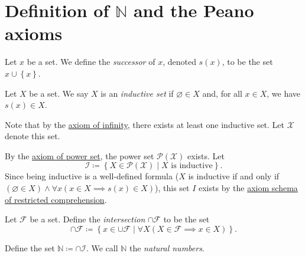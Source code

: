 \documentclass{article}
\begin{document}
\section{Definition of $\mathbb{N}$ and the Peano axioms}

\begin{definition}\label{dfn:6}
	Let $x$ be a set. We define the \emph{successor} of $x$, denoted $s(x)$, to be the set $x \cup \left\{ x \right\} $.
\end{definition}

\begin{definition}\label{dfn:7}
	Let $X$ be a set. We say $X$ is an \emph{inductive set} if $\varnothing \in X$ and, for all $x\in X$, we have $s(x)\in X$.
\end{definition}

Note that by the \hyperref[axiom:infinity]{axiom of infinity}, there exists at least one inductive set. Let $\mathcal{X} $ denote this set.

\begin{construction}\label{const:8}
	By the \hyperref[axiom:powerset]{axiom of power set}, the power set $\mathcal{P} (\mathcal{X} )$ exists. Let
	\[
		\mathcal{I} \coloneqq \left\{ X \in \mathcal{P} (\mathcal{X} ) \mid X\text{ is inductive}  \right\} 
	.\]
	Since being inductive is a well-defined formula ($X$ is inductive if and only if $(\varnothing \in X)\land \forall x(x\in X \implies s(x)\in X)$), this set $I$ exists by the \hyperref[axiom:comprehension]{axiom schema of restricted comprehension}.
\end{construction}
\begin{definition}\label{dfn:9}
	Let $\mathcal{F} $ be a set. Define the \emph{intersection} $\cap \mathcal{F} $ to be the set
	\[
		\cap \mathcal{F}  \coloneqq \left\{ x\in \cup \mathcal{F} \mid \forall X(X\in \mathcal{F} \implies x\in X) \right\} 
	.\]
\end{definition}
\begin{definition}\label{dfn:10}
	Define the set $\mathbb{N} \coloneqq \cap \mathcal{I}$. We call $\mathbb{N} $ the \emph{natural numbers}.
\end{definition}
\end{document}
